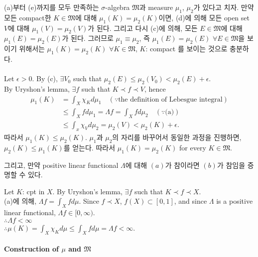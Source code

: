 \documentclass[11pt,reqno]{amsart}
\renewcommand{\(}{\left(}
\renewcommand{\)}{\right)}
\renewcommand{\[}{\left[}
\renewcommand{\]}{\right]}
\newcommand{\ep}{\epsilon}
\newenvironment{textbox}
  {\begin{tcolorbox}[
    colback=gray!10, 
    colframe=gray!50, 
    boxrule=0.5pt,
    fontupper=\normalfont
  ]}
  {\end{tcolorbox}}
\newcommand{\subheading}[1]{\vspace{1em}{\noindent\large\bfseries \textlangle{} #1 \textrangle{} \par}\vspace{1em}}
\newcommand{\M}{\mathfrak{M}}
\begin{document}
\begin{textbox}
  (a)부터 (e)까지를 모두 만족하는 $\sigma$-algebra $\M$과 measure $\mu_1$, $\mu_2$가 있다고 치자. 
  만약 모든 compact한 $K \in \M$에 대해 $\mu_1(K) = \mu_2(K)$이면, (d)에 의해 모든 open set $V$에
  대해 $\mu_1(V) = \mu_2(V)$가 된다. 그리고 다시 (c)에 의해, 모든 $E \in \M$에 대해 
  $\mu_1(E) = \mu_2(E)$가 된다. 그러므로 $\mu_1 \equiv \mu_2$, 즉 $\mu_1(E) = \mu_2(E)$ 
  $\forall E \in \M$을 보이기 위해서는 $\mu_1(K) = \mu_2(K)$ $\forall K \in \M$, $K$: compact 를
  보이는 것으로 충분하다. \\ \\
  Let $\ep > 0$. By (c), $\exists V_0$ such that $\mu_2(E) \le \mu_2(V_0) < \mu_2(E) + \ep$. \\
  By Uryshon's lemma, $\exists f$ such that $K \prec f \prec V$, hence \\
  \begin{align*}
    \mu_1(K) & = \int_X \chi_K d\mu_1 \quad (\because \text{the definition of Lebesgue integral})\\
    & \le \int_X f d\mu_1 = \Lambda f = \int_X f d\mu_2 \quad (\because \text{(a)})\\
    & \le \int_x \chi_V d\mu_2 = \mu_2 (V) < \mu_2 (K) + \ep.
  \end{align*}
  따라서 $\mu_1(K) \le \mu_2(K)$. $\mu_1$과 $\mu_2$의 자리를 바꾸어서 동일한 과정을 진행하면, 
  $\mu_2(K) \le \mu_1(K)$를 얻는다. 따라서 $\mu_1(K) = \mu_2(K)$ for every $K \in \M$.
\end{textbox}

그리고, 만약 positive linear functional $\Lambda$에 대해 $(a)$가 참이라면 $(b)$가 참임을 증명할 수 있다.

\subheading{proof}

\begin{textbox}
  Let $K$: cpt in $X$. By Uryshon's lemma, $\exists f$ such that $K \prec f \prec X$. \\
  (a)에 의해, $\Lambda f = \int_X f d\mu$. Since $f \prec X$, $f(X) \subset [0, 1]$, and 
  since $\Lambda$ is a positive linear functional, $\Lambda f \in [0, \infty)$. \\
  $\therefore \Lambda f < \infty$ \\
  $\therefore \mu (K) = \int_X \chi_K d\mu \le \int_X f d\mu = \Lambda f < \infty$.
\end{textbox}

\paragraph{Construction of $\mu$ and $\M$}
\end{document}
